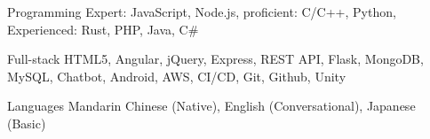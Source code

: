 
\begin{cvskills}
    \cvskill
    {Programming} %
    {Expert: JavaScript, Node.js, proficient: C/C++, Python, Experienced: Rust, PHP, Java, C\#} %

      \cvskill
        {Full-stack} %
        {HTML5, Angular, jQuery, Express, REST API, Flask, MongoDB, MySQL, Chatbot, Android, AWS, CI/CD, Git, Github, Unity} %

      \cvskill
        {Languages} %
        {Mandarin Chinese (Native), English (Conversational), Japanese (Basic)} %
    
\end{cvskills}
